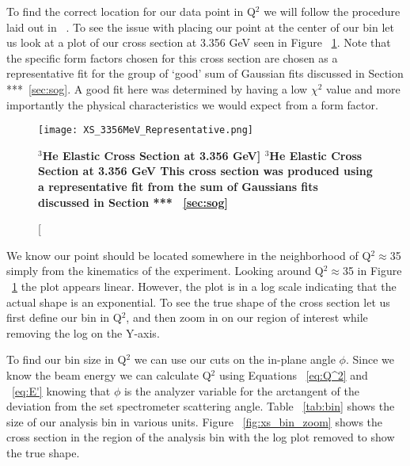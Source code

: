 To find the correct location for our data point in Q$^2$ we will follow the procedure laid out in ~\cite{Article:data_placement}. To see the issue with placing our point at the center of our bin let us look at a plot of our cross section at 3.356 GeV seen in Figure ~\ref{fig:xs_bin}. Note that the specific form factors chosen for this cross section are chosen as a representative fit for the group of `good' sum of Gaussian fits discussed in Section ***~\ref{sec:sog}. A good fit here was determined by having a low $\chi^2$ value and more importantly the physical characteristics we would expect from a form factor. 

\begin{figure}[!ht]
\begin{center}
\texttt{[image: XS\_3356MeV\_Representative.png]}
\end{center}
\caption[\bf{$^3$He Elastic Cross Section at 3.356 GeV}]{
{\bf{$^3$He Elastic Cross Section at 3.356 GeV}} This cross section was produced using a representative fit from the sum of Gaussians fits discussed in Section *** ~\ref{sec:sog}}
\label{fig:xs_bin}
\end{figure}

We know our point should be located somewhere in the neighborhood of Q$^2 \approx$35 simply from the kinematics of the experiment. Looking around Q$^2 \approx$35 in Figure ~\ref{fig:xs_bin} the plot appears linear. However, the plot is in a log scale indicating that the actual shape is an exponential. To see the true shape of the cross section let us first define our bin in Q$^2$, and then zoom in on our region of interest while removing the log on the Y-axis. 

To find our bin size in Q$^2$ we can use our cuts on the in-plane angle $\phi$. Since we know the beam energy we can calculate Q$^2$ using Equations ~\ref{eq:Q^2} and ~\ref{eq:E'} knowing that $\phi$ is the analyzer variable for the arctangent of the deviation from the set spectrometer scattering angle. Table ~\ref{tab:bin} shows the size of our analysis bin in various units. Figure ~\ref{fig:xs_bin_zoom} shows the cross section in the region of the analysis bin with the log plot removed to show the true shape.

\vspace{5mm}

